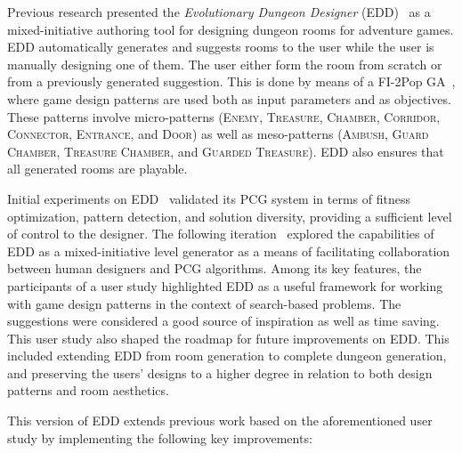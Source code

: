 \documentclass[sigconf]{acmart}
\begin{document}
Previous research presented the \emph{Evolutionary Dungeon Designer} (EDD)~\cite{Eddy1_5, Eddy2} as a mixed-initiative authoring tool for designing dungeon rooms for adventure games. EDD automatically generates and suggests rooms to the user while the user is manually designing one of them. The user either form the room from scratch or from a previously generated suggestion. This is done by means of a FI-2Pop GA~\cite{kimbrough_feasibleinfeasible_2008}, where game design patterns are used both as input parameters and as objectives. These patterns involve micro-patterns (\textsc{Enemy}, \textsc{Treasure}, \textsc{Chamber}, \textsc{Corridor}, \textsc{Connector}, \textsc{Entrance}, and \textsc{Door}) as well as meso-patterns (\textsc{Ambush}, \textsc{Guard Chamber}, \textsc{Treasure Chamber}, and \textsc{Guarded Treasure}). EDD also ensures that all generated rooms are playable.

Initial experiments on EDD~\cite{Eddy1_5} validated its PCG system in terms of fitness optimization, pattern detection, and solution diversity, providing a sufficient level of control to the designer. The following iteration~\cite{Eddy2} explored the capabilities of EDD as a mixed-initiative level generator as a means of facilitating collaboration between human designers and PCG algorithms. Among its key features, the participants of a user study highlighted EDD as a useful framework for working with game design patterns in the context of search-based problems. The suggestions were considered a good source of inspiration as well as time saving. This user study also shaped the roadmap for future improvements on EDD. This included extending EDD from room generation to complete dungeon generation, and preserving the users' designs to a higher degree in relation to both design patterns and room aesthetics.

This version of EDD extends previous work based on the aforementioned user study by implementing the following key improvements:
\end{document}
